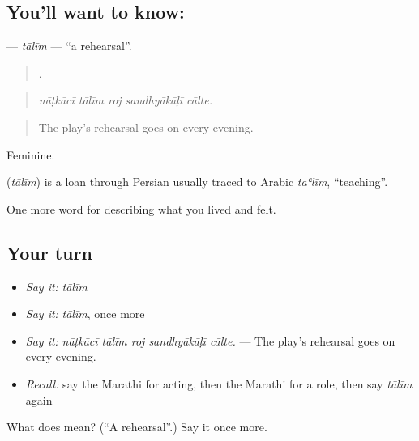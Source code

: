 \subsection*{You'll want to know: }
\textbf{} — \emph{tālīm} — \textquotedblleft{}a rehearsal\textquotedblright{}.

\begin{quote}
    .
\end{quote}

\begin{quote}
\emph{nāṭkācī tālīm roj sandhyākāḷī cālte.}
\end{quote}

\begin{quote}
The play's rehearsal goes on every evening.
\end{quote}

Feminine.

\begin{cousinweb}
\textbf{} (\emph{tālīm}) is a loan through Persian usually traced to Arabic \emph{taʿlīm}, \textquotedblleft{}teaching\textquotedblright{}.
\end{cousinweb}

\begin{grammarlens}[title={What you've built}]
One more word for describing what you lived and felt.
\end{grammarlens}

\subsection*{Your turn}
\begin{itemize}
\raggedright
  \item \emph{Say it:} \emph{tālīm}
  \item \emph{Say it:} \emph{tālīm}, once more
  \item \emph{Say it:} \emph{nāṭkācī tālīm roj sandhyākāḷī cālte.} — The play's rehearsal goes on every evening.
  \item \emph{Recall:} say the Marathi for acting, then the Marathi for a role, then say \emph{tālīm} again
\end{itemize}

\begin{tcolorbox}[breakable,colback=teal!4,colframe=teal!35!black,title={Before you move on}]
What does  mean? (\textquotedblleft{}A rehearsal\textquotedblright{}.) Say it once more.
\end{tcolorbox}
